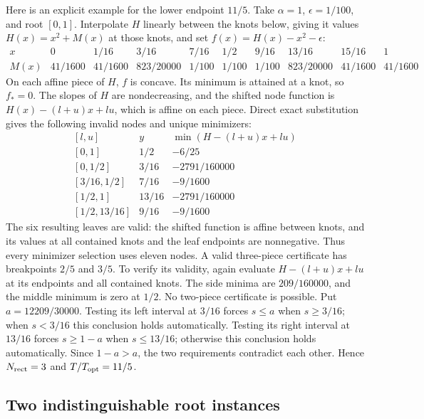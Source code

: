 Here is an explicit example for the lower endpoint $11/5$. Take
$\alpha=1$, $\epsilon=1/100$, and root $[0,1]$. Interpolate $H$ linearly
between the knots below, giving it values $H(x)=x^2+M(x)$ at those knots,
and set $f(x)=H(x)-x^2-\epsilon$:
\[
\begin{array}{c|ccccccccc}
 x&0&1/16&3/16&7/16&1/2&9/16&13/16&15/16&1\\ \hline
 M(x)&41/1600&41/1600&823/20000&1/100&1/100&1/100&
                         823/20000&41/1600&41/1600
\end{array}
\]
On each affine piece of $H$, $f$ is concave. Its minimum is attained
at a knot, so $f_*=0$. The slopes of $H$ are nondecreasing, and the
shifted node function is $H(x)-(l+u)x+lu$, which is affine on each piece.
Direct exact substitution gives the following invalid nodes and unique
minimizers:
\[
\begin{array}{c|c|c}
 {[l,u]}&y&\min(H-(l+u)x+lu)\\ \hline
 {[0,1]}&1/2&-6/25\\
 {[0,1/2]}&3/16&-2791/160000\\
 {[3/16,1/2]}&7/16&-9/1600\\
 {[1/2,1]}&13/16&-2791/160000\\
 {[1/2,13/16]}&9/16&-9/1600
\end{array}
\]
The six resulting leaves are valid: the shifted function is affine
between knots, and its values at all contained knots and the leaf
endpoints are nonnegative. Thus every minimizer selection uses eleven
nodes. A valid three-piece certificate has breakpoints $2/5$ and $3/5$.
To verify its validity, again evaluate $H-(l+u)x+lu$ at its endpoints
and all contained knots. The side minima are $209/160000$, and the
middle minimum is zero at $1/2$.
No two-piece certificate is possible. Put $a=12209/30000$.
Testing its left interval at $3/16$ forces $s\le a$ when $s\ge3/16$;
when $s<3/16$ this conclusion holds automatically.
Testing its right interval at $13/16$ forces $s\ge1-a$ when
$s\le13/16$; otherwise this conclusion holds automatically.
Since $1-a>a$, the two requirements contradict each other.
Hence $N_{\rm rect}=3$ and $T/T_{\rm opt}=11/5$.

\subsection{Two indistinguishable root instances}
\label{app:branching-information}

